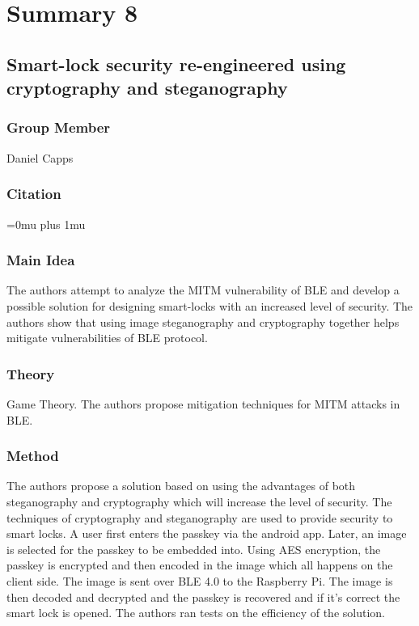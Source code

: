 \section{Summary 8}

\noindent
\subsection{{S}mart-lock security re-engineered using cryptography and steganography}

\subsubsection{Group Member}

\noindent
Daniel Capps

\noindent
\subsubsection{Citation}

\Urlmuskip=0mu plus 1mu\relax


\subsubsection{Main Idea}

\noindent
The authors attempt to analyze the MITM vulnerability of BLE and develop a possible solution for designing smart-locks with an increased level of security. The authors show that using image steganography and cryptography together helps mitigate vulnerabilities of BLE protocol.




\subsubsection{Theory}

\noindent
Game Theory. The authors propose mitigation techniques for MITM attacks in BLE.


\subsubsection{Method}

\noindent
The authors propose a solution based on using the advantages of both steganography and cryptography which will increase the level of security. The techniques of cryptography and steganography are used to provide security to smart locks. A user first enters the passkey via the android app. Later, an image is selected for the passkey to be embedded into. Using AES encryption, the passkey is encrypted and then encoded in the image which all happens on the client side. The image is sent over BLE 4.0 to the Raspberry Pi. The image is then decoded and decrypted and the passkey is recovered and if it’s correct the smart lock is opened. The authors ran tests on the efficiency of the solution. 



